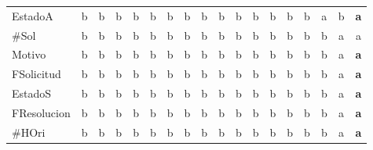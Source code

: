 {\begin{longtable}{lccccccccccccccccc}
EstadoA & \color{grisclaro}b & \color{grisclaro}b & \color{grisclaro}b & \color{grisclaro}b & \color{grisclaro}b & \color{grisclaro}b & \color{grisclaro}b & \color{grisclaro}b & \color{grisclaro}b & \color{grisclaro}b & \color{grisclaro}b & \color{grisclaro}b & \color{grisclaro}b & \color{grisclaro}b & a & \color{grisclaro}b & \textbf{\color{azuldos}a} \\
\#Sol & \color{grisclaro}b & \color{grisclaro}b & \color{grisclaro}b & \color{grisclaro}b & \color{grisclaro}b & \color{grisclaro}b & \color{grisclaro}b & \color{grisclaro}b & \color{grisclaro}b & \color{grisclaro}b & \color{grisclaro}b & \color{grisclaro}b & \color{grisclaro}b & \color{grisclaro}b & \color{grisclaro}b & a & a \\
Motivo & \color{grisclaro}b & \color{grisclaro}b & \color{grisclaro}b & \color{grisclaro}b & \color{grisclaro}b & \color{grisclaro}b & \color{grisclaro}b & \color{grisclaro}b & \color{grisclaro}b & \color{grisclaro}b & \color{grisclaro}b & \color{grisclaro}b & \color{grisclaro}b & \color{grisclaro}b & \color{grisclaro}b & a & \textbf{\color{azuldos}a} \\
FSolicitud & \color{grisclaro}b & \color{grisclaro}b & \color{grisclaro}b & \color{grisclaro}b & \color{grisclaro}b & \color{grisclaro}b & \color{grisclaro}b & \color{grisclaro}b & \color{grisclaro}b & \color{grisclaro}b & \color{grisclaro}b & \color{grisclaro}b & \color{grisclaro}b & \color{grisclaro}b & \color{grisclaro}b & a & \textbf{\color{azuldos}a} \\
EstadoS & \color{grisclaro}b & \color{grisclaro}b & \color{grisclaro}b & \color{grisclaro}b & \color{grisclaro}b & \color{grisclaro}b & \color{grisclaro}b & \color{grisclaro}b & \color{grisclaro}b & \color{grisclaro}b & \color{grisclaro}b & \color{grisclaro}b & \color{grisclaro}b & \color{grisclaro}b & \color{grisclaro}b & a & \textbf{\color{azuldos}a} \\
FResolucion & \color{grisclaro}b & \color{grisclaro}b & \color{grisclaro}b & \color{grisclaro}b & \color{grisclaro}b & \color{grisclaro}b & \color{grisclaro}b & \color{grisclaro}b & \color{grisclaro}b & \color{grisclaro}b & \color{grisclaro}b & \color{grisclaro}b & \color{grisclaro}b & \color{grisclaro}b & \color{grisclaro}b & a & \textbf{\color{azuldos}a} \\
\#HOri & \color{grisclaro}b & \color{grisclaro}b & \color{grisclaro}b & \color{grisclaro}b & \color{grisclaro}b & \color{grisclaro}b & \color{grisclaro}b & \color{grisclaro}b & \color{grisclaro}b & \color{grisclaro}b & \color{grisclaro}b & \color{grisclaro}b & \color{grisclaro}b & \color{grisclaro}b & \color{grisclaro}b & a & \textbf{\color{azuldos}a} \\

\end{longtable}}
